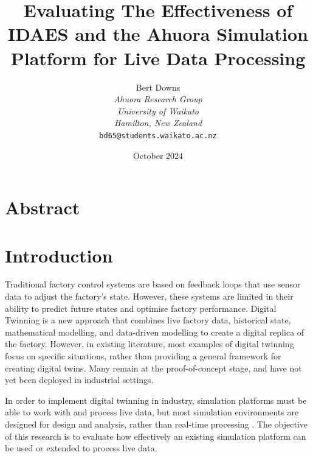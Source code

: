 \documentclass[12pt]{article}
\title{Evaluating The Effectiveness of IDAES and the Ahuora Simulation Platform for Live Data Processing}
\author{Bert Downs\\
\textit{Ahuora Research Group}\\
\textit{University of Waikato}\\
\textit{Hamilton, New Zealand}\\
\texttt{bd65@students.waikato.ac.nz}}
\date{October 2024}
\begin{document}
\maketitle

\section*{Abstract}



\section{Introduction}


Traditional factory control systems are based on feedback loops that use sensor data to adjust the factory's state. However, these systems are limited in their ability to predict future states and optimise factory performance. Digital Twinning is a new approach that combines live factory data, historical state, mathematical modelling, and data-driven modelling to create a digital replica of the factory. 
However, in existing literature, most examples of digital twinning focus on specific situations, rather than providing a general framework for creating digital twins. Many remain at the proof-of-concept stage, and have not yet been deployed in industrial settings.

In order to implement digital twinning in industry, simulation platforms must be able to work with and process live data, but most simulation environments are designed for design and analysis, rather than real-time processing \cite{agi2024computational}. The objective of this research is to evaluate how effectively an existing simulation platform can be used or extended to process live data.
\end{document}
